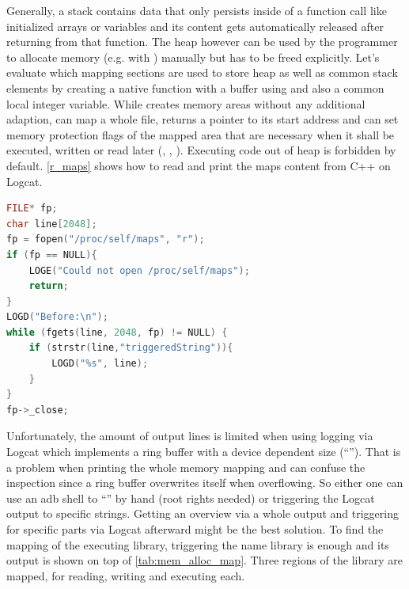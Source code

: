 Generally, a stack contains data that only persists inside of a function call like initialized arrays or variables and its content gets automatically released after returning from that function.
The heap however can be used by the programmer to allocate memory
(e.g. with ) manually but has to be freed explicitly.
Let's evaluate which mapping sections are used to store heap as well as common stack elements by creating a native function with a buffer using  and also a common local integer variable.
While  creates memory areas
without any additional adaption,  can map a whole file, returns a pointer to its start address and can set memory protection flags of the mapped area that are necessary when it shall be executed, written or read later
(, , ).
Executing code out of heap is forbidden by default.
\autoref{r_maps} shows how to read and print the maps content from C++ on Logcat.
\begin{lstlisting}[language=C++, caption=Reading /proc/self/maps, label=r_maps]
FILE* fp;
char line[2048];
fp = fopen("/proc/self/maps", "r");
if (fp == NULL){
    LOGE("Could not open /proc/self/maps");
    return;
}
LOGD("Before:\n");
while (fgets(line, 2048, fp) != NULL) {
    if (strstr(line,"triggeredString")){
        LOGD("%s", line);
    }
}
fp->_close;
\end{lstlisting}
Unfortunately, the amount of output lines is limited when using logging via Logcat which
implements a ring buffer with a device dependent size (``''). That
is a problem when printing the whole memory mapping and can confuse the inspection
since a ring buffer overwrites itself when overflowing. So either one can use an adb shell to ``'' by hand (root rights needed)
or triggering the Logcat output to specific strings. Getting an overview via a whole output and triggering for specific parts via Logcat afterward might be the best solution.
To find the mapping of the executing library, triggering the name library is enough
and its output is shown on top of \autoref{tab:mem_alloc_map}. Three regions
of the library are mapped, for reading, writing and executing each.
